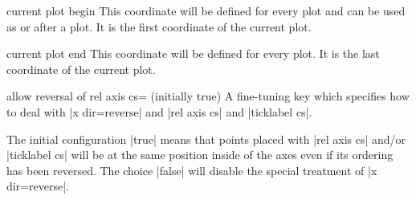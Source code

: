 \begin{predefinednode}{current plot begin}
	This coordinate will be defined for every plot and can be used as  or after a plot. It is the first coordinate of the current plot.	
\end{predefinednode}

\begin{predefinednode}{current plot end}
	This coordinate will be defined for every plot. It is the last coordinate of the current plot.	
\end{predefinednode}

\begin{pgfplotskey}{allow reversal of rel axis cs= (initially true)}
	A fine-tuning key which specifies how to deal with |x dir=reverse| and |rel axis cs| and |ticklabel cs|.

	The initial configuration |true| means that points placed with |rel axis cs| and/or |ticklabel cs| will be at the same position inside of the axes even if its ordering has been reversed. The choice |false| will disable the special treatment of |x dir=reverse|.
\end{pgfplotskey}

